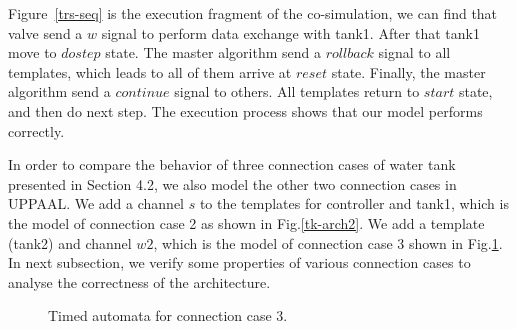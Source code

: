 Figure~\ref{trs-seq} is the execution fragment of the co-simulation, we can find that valve send a $w$ signal to perform data exchange with tank1. After that tank1 move to $dostep$ state. The master algorithm send a $rollback$ signal to all templates, which leads to all of them arrive at $reset$ state. Finally, the master algorithm send a $continue$ signal to others. All templates return to $start$ state, and then do next step. The execution process shows that our model performs correctly.

In order to compare the behavior of three connection cases of water tank presented in Section 4.2, we also model the other two connection cases in UPPAAL. We add a channel $s$ to the templates for controller and tank1, which is the model of connection case 2 as shown in Fig.\ref{tk-arch2}. We add a template (tank2) and channel $w2$, which is the model of connection case 3 shown in Fig.\ref{arc3}. In next subsection, we verify some properties of various connection cases to analyse the correctness of the architecture.
\begin{figure}[htbp]
\end{figure}
\begin{figure}[htbp]
	\caption{Timed automata for connection case 3.}\label{arc3}
\end{figure}
